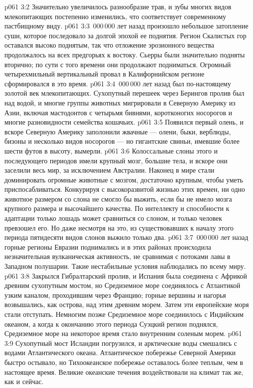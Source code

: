 \vs p061 3:2 Значительно увеличилось разнообразие трав, и зубы многих видов млекопитающих постепенно изменились, что соответствует современному пастбищному виду.
\vs p061 3:3 \,000\,000 лет назад произошло небольшое затопление суши, которое последовало за долгой эпохой ее поднятия. Регион Скалистых гор оставался высоко поднятым, так что отложение эрозионного вещества продолжалось на всех предгорьях к востоку. Сьерры были значительно подняты вторично; по сути с того времени они продолжают подниматься. Огромный четырехмильный вертикальный провал в Калифорнийском регионе сформировался в это время.
\vs p061 3:4 \,000\,000 лет назад был по\hyp{}настоящему золотой век млекопитающих. Сухопутный перешеек через Берингов пролив был над водой, и многие группы животных мигрировали в Северную Америку из Азии, включая мастодонтов с четырьмя бивнями, коротконогих носорогов и многие разновидности семейства кошачьих.
\vs p061 3:5 Появился первый олень, и вскоре Северную Америку заполонили жвачные --- олени, быки, верблюды, бизоны и несколько видов носорогов --- но гигантские свиньи, имевшие более шести футов в высоту, вымерли.
\vs p061 3:6 Колоссальные слоны этого и последующего периодов имели крупный мозг, большие тела, и вскоре они заселили весь мир, за исключением Австралии. Наконец в мире стали доминировать огромные животные с мозгом, достаточно крупным, чтобы уметь приспосабливаться. Конкурируя с высокоразвитой жизнью этих времен, ни одно животное размером со слона не смогло бы выжить, если бы не имело мозга крупного размера и высочайшего качества. По интеллекту и способности к адаптации только лошадь может сравниться со слоном, и только человек превзошел его. Но даже несмотря на это, из существовавших к началу этого периода пятидесяти видов слонов выжило только два.
\vs p061 3:7 \,000\,000 лет назад горные регионы Евразии поднимались и в этих районах происходила незначительная вулканическая активность, не сравнимая с потоками лавы в Западном полушарии. Такие нестабильные условия наблюдались по всему миру.
\vs p061 3:8 Закрылся Гибралтарский пролив, и Испания была соединена с Африкой древним сухопутным мостом, но Средиземное море соединялось с Атлантикой узким каналом, проходившим через Францию; горные вершины и нагорья возвышались, как острова, над этим древним морем. Затем эти европейские моря стали отступать. Немногим позже Средиземное море соединилось с Индийским океаном, а когда к окончанию этого периода Суэцкий регион поднялся, Средиземное море на некоторое время стало внутренним соленым морем.
\vs p061 3:9 Сухопутный мост Исландии погрузился, и арктические воды смешались с водами Атлантического океана. Атлантическое побережье Северной Америки быстро остывало, но Тихоокеанское побережье оставалось более теплым, чем в настоящее время. Великие океанские течения воздействовали на климат так же, как и сейчас.
